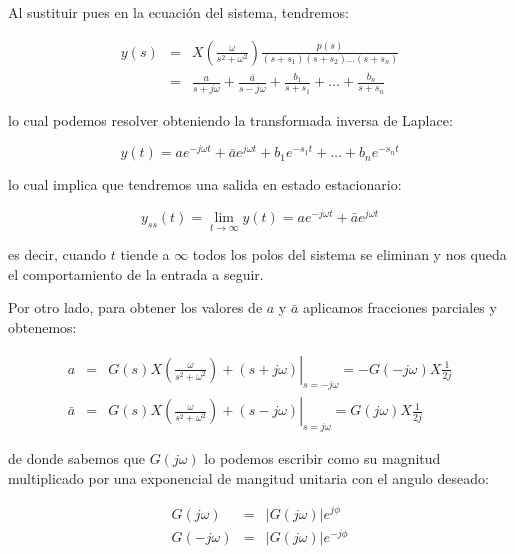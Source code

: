    Al sustituir pues en la ecuación del sistema, tendremos:

    \begin{eqnarray*}
        y(s) & = & X \left( \frac{\omega}{s^2 + \omega^2} \right) \frac{p(s)}{(s + s_1) (s + s_2) \dots (s + s_n)} \\
        & = & \frac{a}{s + j \omega} + \frac{\bar{a}}{s - j \omega} + \frac{b_1}{s + s_1} + \dots + \frac{b_n}{s + s_n}
    \end{eqnarray*}

    lo cual podemos resolver obteniendo la transformada inversa de Laplace:

    \begin{equation*}
        y(t) = a e^{-j \omega t} + \bar{a} e^{j \omega t} + b_1 e^{-s_1 t} + \dots + b_n e^{-s_n t}
    \end{equation*}

    lo cual implica que tendremos una salida en estado estacionario:

    \begin{equation*}
        y_{ss}(t) = \lim_{t \to \infty} y(t) = a e^{-j \omega t} + \bar{a} e ^{j \omega t}
    \end{equation*}

    es decir, cuando $t$ tiende a $\infty$ todos los polos del sistema se eliminan y nos queda el comportamiento de la entrada a seguir.

    Por otro lado, para obtener los valores de $a$ y $\bar{a}$ aplicamos fracciones parciales y obtenemos:

    \begin{eqnarray*}
        a & = & \left. G(s) X \left( \frac{\omega}{s^2 + \omega^2} \right) + (s + j \omega) \right|_{s=-j \omega} = - G(-j \omega) X \frac{1}{2j} \\
        \bar{a} & = & \left. G(s) X \left( \frac{\omega}{s^2 + \omega^2} \right) + (s - j \omega) \right|_{s=j \omega} = G(j \omega) X \frac{1}{2j}
    \end{eqnarray*}

    de donde sabemos que $G(j \omega)$ lo podemos escribir como su magnitud multiplicado por una exponencial de mangitud unitaria con el angulo deseado:

    \begin{eqnarray*}
        G(j \omega) & = & \left| G(j \omega) \right| e^{j \phi} \\
        G(-j \omega) & = & \left| G(j \omega) \right| e^{-j \phi}
    \end{eqnarray*}

